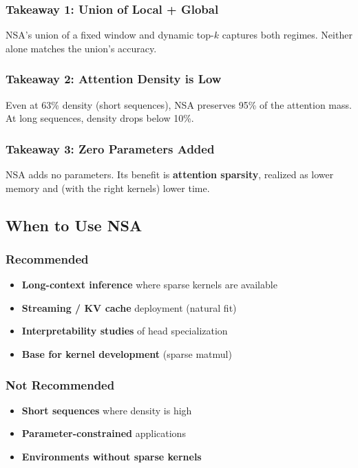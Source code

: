 \subsubsection{Takeaway 1: Union of Local + Global}

NSA's union of a fixed window and dynamic top-$k$ captures both regimes. 
Neither alone matches the union's accuracy.

\subsubsection{Takeaway 2: Attention Density is Low}

Even at 63\% density (short sequences), NSA preserves 95\% of the attention 
mass. At long sequences, density drops below 10\%.

\subsubsection{Takeaway 3: Zero Parameters Added}

NSA adds no parameters. Its benefit is \textbf{attention sparsity}, realized as 
lower memory and (with the right kernels) lower time.

\subsection{When to Use NSA}

\subsubsection{Recommended}

\begin{itemize}
\item \textbf{Long-context inference} where sparse kernels are available
\item \textbf{Streaming / KV cache} deployment (natural fit)
\item \textbf{Interpretability studies} of head specialization
\item \textbf{Base for kernel development} (sparse matmul)

\end{itemize}
\subsubsection{Not Recommended}

\begin{itemize}
\item \textbf{Short sequences} where density is high
\item \textbf{Parameter-constrained} applications
\item \textbf{Environments without sparse kernels}

\end{itemize}
